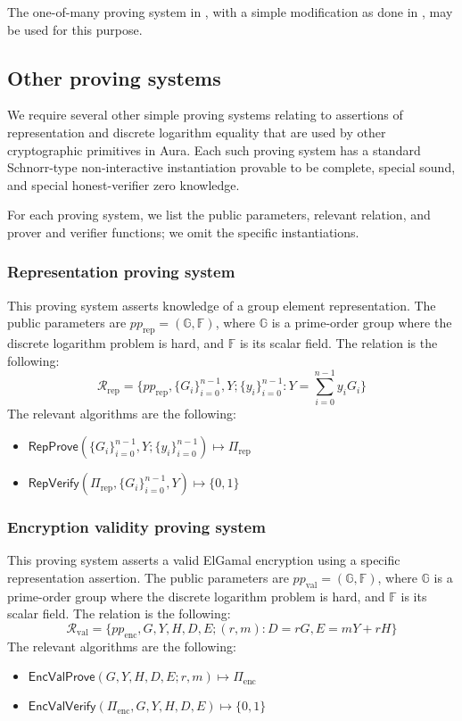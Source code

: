\documentclass{article}
\newcommand{\G}{\mathbb{G}}
\newcommand{\F}{\mathbb{F}}
\newcommand{\func}[1]{\mathsf{#1}}
\begin{document}
The one-of-many proving system in \cite{bootle}, with a simple modification as done in \cite{spark}, may be used for this purpose.


\subsection{Other proving systems}

We require several other simple proving systems relating to assertions of representation and discrete logarithm equality that are used by other cryptographic primitives in Aura.
Each such proving system has a standard Schnorr-type non-interactive instantiation provable to be complete, special sound, and special honest-verifier zero knowledge.

For each proving system, we list the public parameters, relevant relation, and prover and verifier functions; we omit the specific instantiations.


\subsubsection{Representation proving system}

This proving system asserts knowledge of a group element representation.
The public parameters are $pp_{\text{rep}} = (\G, \F)$, where $\G$ is a prime-order group where the discrete logarithm problem is hard, and $\F$ is its scalar field.
The relation is the following:
$$\mathcal{R}_{\text{rep}} = \{ pp_{\text{rep}}, \{G_i\}_{i=0}^{n-1}, Y ; \{y_i\}_{i=0}^{n-1} : Y = \sum_{i=0}^{n-1} y_i G_i \}$$
The relevant algorithms are the following:
\begin{itemize}
    \item $\func{RepProve}(\{G_i\}_{i=0}^{n-1}, Y ; \{y_i\}_{i=0}^{n-1}) \mapsto \Pi_{\text{rep}}$
    \item $\func{RepVerify}(\Pi_{\text{rep}}, \{G_i\}_{i=0}^{n-1}, Y) \mapsto \{0, 1\}$
\end{itemize}


\subsubsection{Encryption validity proving system}

This proving system asserts a valid ElGamal encryption using a specific representation assertion.
The public parameters are $pp_{\text{val}} = (\G, \F)$, where $\G$ is a prime-order group where the discrete logarithm problem is hard, and $\F$ is its scalar field.
The relation is the following:
$$\mathcal{R}_{\text{val}} = \{ pp_{\text{enc}}, G, Y, H, D, E ; (r, m) : D = rG, E = mY + rH \}$$
The relevant algorithms are the following:
\begin{itemize}
    \item $\func{EncValProve}(G, Y, H, D, E ; r, m) \mapsto \Pi_{\text{enc}}$
    \item $\func{EncValVerify}(\Pi_{\text{enc}}, G, Y, H, D, E) \mapsto \{0, 1\}$
\end{itemize}
\end{document}
